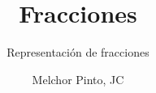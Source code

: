 \documentclass{guia}
\title{Fracciones}
\subtitle{Representación de fracciones}
\author{Melchor Pinto, JC}
\begin{document}
%
\begin{questions}
\questionboxed{}
\end{questions}
\end{document}
